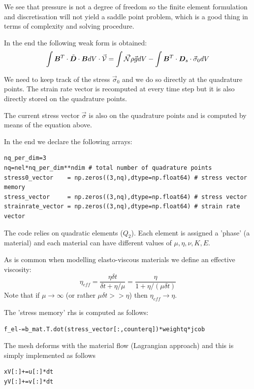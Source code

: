 We see that pressure is not a degree of freedom so the finite element
formulation and discretisation will not yield a saddle point problem, 
which is a good thing in terms of complexity and solving procedure.

In the end the following weak form is obtained:
\[
\int {\bm B}^T \cdot \tilde{\bm D} \cdot {\bm B} dV \cdot \vec{\cal V} 
= \int \vec{{\mathcal{N}}} \rho \vec{g} dV -\int {\bm B}^T \cdot {\bm D}_s \cdot \vec{\sigma}_0 dV
\]

We need to keep track of the stress $\vec{\sigma}_0$ and 
we do so directly at the quadrature points.
The strain rate vector is recomputed at every time step but it is also 
directly stored on the quadrature points.

The current stress vector $\vec{\sigma}$ is also on the quadrature points and
is computed by means of the equation above.

In the end we declare the following arrays:
\begin{lstlisting}
nq_per_dim=3
nq=nel*nq_per_dim**ndim # total number of quadrature points
stress0_vector    = np.zeros((3,nq),dtype=np.float64) # stress vector memory
stress_vector     = np.zeros((3,nq),dtype=np.float64) # stress vector 
strainrate_vector = np.zeros((3,nq),dtype=np.float64) # strain rate vector
\end{lstlisting}

The code relies on quadratic elements ($Q_2$).
Each element is assigned a 'phase' (a material) and 
each material can have different values of $\mu, \eta, \nu, K, E$.

As is common when modelling elasto-viscous materials
we define an effective viscosity:
\[
\eta_{eff} 
= \frac{\eta \delta t}{\delta t + \eta/\mu} 
= \frac{\eta }{1 + \eta/(\mu \delta t)} 
\]
Note that if $\mu\rightarrow \infty$ (or rather $\mu \delta t >> \eta$) 
then $\eta_{eff} \rightarrow \eta$. 





The 'stress memory' rhs is computed as follows:
\begin{lstlisting}
f_el-=b_mat.T.dot(stress_vector[:,counterq])*weightq*jcob
\end{lstlisting}



The mesh deforms with the material flow (Lagrangian approach)
and this is simply implemented as follows 

\begin{lstlisting}
xV[:]+=u[:]*dt
yV[:]+=v[:]*dt
\end{lstlisting}

